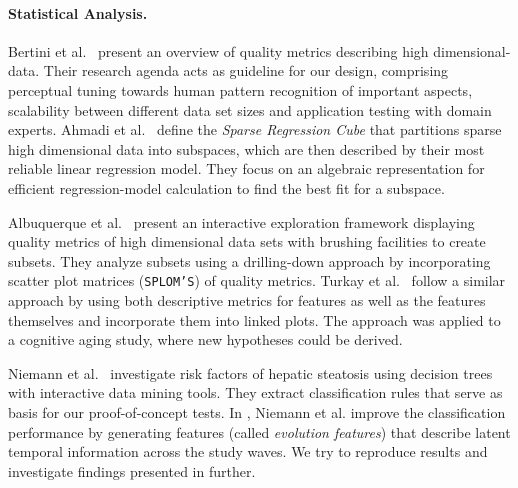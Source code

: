 \documentclass[journal]{style/vgtc} 			          %
\begin{document}
\paragraph{Statistical Analysis.}
Bertini et al.~\cite{Bertini} present an overview of quality metrics describing high dimensional-data.
Their research agenda acts as guideline for our design, comprising perceptual tuning towards human pattern recognition of important aspects, scalability between different data set sizes and application testing with domain experts.
Ahmadi et al.~\cite{Ahmadi} define the \emph{Sparse Regression Cube} that partitions sparse high dimensional data into subspaces, which are then described by their most reliable linear regression model.
They focus on an algebraic representation for efficient regression-model calculation to find the best fit for a subspace.

Albuquerque et al.~\cite{Albuquerque} present an interactive exploration framework displaying quality metrics of high dimensional data sets with brushing facilities to create subsets.
They analyze subsets using a drilling-down approach by incorporating scatter plot matrices (\texttt{SPLOM'S}) of quality metrics. %
Turkay et al.~\cite{Turkay} follow a similar approach by using both descriptive metrics for features as well as the features themselves and incorporate them into linked plots.
The approach was applied to a cognitive aging study, where new hypotheses could be derived.

Niemann et al.~\cite{Niemann2014} investigate risk factors of hepatic steatosis using decision trees with interactive data mining tools.
They extract classification rules that serve as basis for our proof-of-concept tests.
In \cite{Niemann2015}, Niemann et al. improve the classification performance by generating features (called \emph{evolution features}) that describe latent temporal information across the study waves.
We try to reproduce results and investigate findings presented in \cite{Niemann2014} further.
\end{document}
